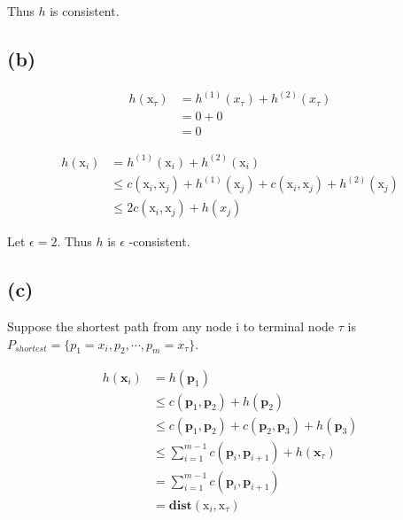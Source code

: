 \documentclass{article} %
\begin{document}
Thus $h$ is consistent.

\subsection{(b)}
\begin{equation*}
    \begin{aligned}
        h\left(\mathrm{x}_{\tau}\right) &=  h^{(1)}(x_{\tau}) + h^{(2)}(x_{\tau}) \\
            &= 0 + 0 \\
            &= 0
    \end{aligned}
\end{equation*}

\begin{equation*}
    \begin{aligned}
        h\left(\mathrm{x}_{i}\right) &= h^{(1)}\left(\mathrm{x}_{i}\right)+h^{(2)}\left(\mathrm{x}_{i}\right)\\
        &\leq c\left(\mathrm{x}_{i}, \mathrm{x}_{j}\right)+h^{(1)}\left(\mathrm{x}_{j}\right) + c\left(\mathrm{x}_{i}, \mathrm{x}_{j}\right)+h^{(2)}\left(\mathrm{x}_{j}\right) \\
        &\leq 2c\left(\mathrm{x}_{i}, \mathrm{x}_{j}\right)+h(x_j)
    \end{aligned}
\end{equation*}

Let $\epsilon = 2$. Thus $h$ is $\epsilon$ -consistent.

\subsection{(c)}
Suppose the shortest path from any node i to terminal node $\tau$ is $P_{shortest}=\{p_1=x_i, p_2, \cdots, p_m=x_{\tau}\}$.

\begin{equation*}
    \begin{aligned}
        h\left(\mathbf{x}_{i}\right) &= h\left(\mathbf{p}_{1}\right) \\
            &\leq c\left(\mathbf{p}_{1}, \mathbf{p}_{2}\right)+h\left(\mathbf{p}_{2}\right) \\
            &\leq c\left(\mathbf{p}_{1}, \mathbf{p}_{2}\right) + c\left(\mathbf{p}_{2}, \mathbf{p}_{3}\right)+h\left(\mathbf{p}_{3}\right) \\
            &\leq \sum_{i=1}^{m-1} c\left(\mathbf{p}_{i}, \mathbf{p}_{i+1}\right) + h\left(\mathbf{x}_{\tau}\right) \\
            &= \sum_{i=1}^{m-1} c\left(\mathbf{p}_{i}, \mathbf{p}_{i+1}\right) \\
            &= \textbf{dist}\left(\mathrm{x}_{i}, \mathrm{x}_{\tau}\right)
    \end{aligned}
\end{equation*}
\end{document}
